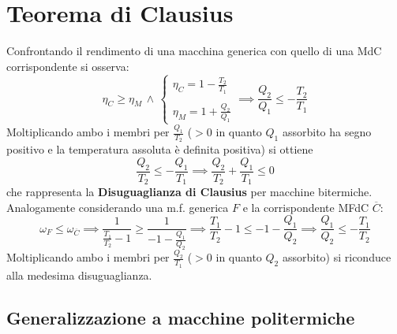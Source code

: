 \documentclass[10pt, oneside]{book}
\newcommand{\ds}{\displaystyle}
\begin{document}
\section{Teorema di Clausius}
Confrontando il rendimento di una macchina generica con quello di una MdC corrispondente si osserva:
\[\eta_C \geq \eta_M \, \land \, \begin{cases} \displaystyle \eta_C = 1 - \frac{T_2}{T_1} \\ \\ \displaystyle \eta_M = 1 + \frac{Q_2}{Q_1}
\end{cases} \implies \frac{Q_2}{Q_1} \leq - \frac{T_2}{T_1}\] 
Moltiplicando ambo i membri per $\ds \frac{Q_1}{T_2}$ ($> 0$ in quanto $Q_1$ assorbito ha segno positivo e la temperatura assoluta è definita positiva) si ottiene
\[\frac{Q_2}{T_2} \leq - \frac{Q_1}{T_1} \implies \boxed{\frac{Q_2}{T_2} + \frac{Q_1}{T_1} \leq 0}\]
che rappresenta la \textbf{Disuguaglianza di Clausius} per macchine bitermiche.\\
Analogamente considerando una m.f. generica $F$ e la corrispondente MFdC $\overline{C}$:
\[\omega_F \leq \omega_{\overline{C}} \implies \frac{1}{\frac{T_1}{T_2} - 1} \geq \frac{1}{-1 - \frac{Q_1}{Q_2}} \implies \frac{T_1}{T_2} - 1 \leq -1 - \frac{Q_1}{Q_2} \implies \frac{Q_1}{Q_2} \leq - \frac{T_1}{T_2}\]
Moltiplicando ambo i membri per $\ds \frac{Q_2}{T_1}$ ($> 0$ in quanto $Q_2$ assorbito) si riconduce alla medesima disuguaglianza.

\subsection{Generalizzazione a macchine politermiche}
\end{document}

